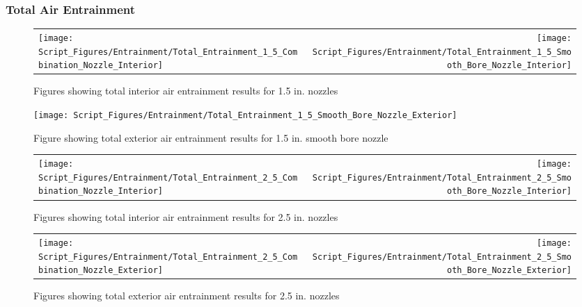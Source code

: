 \documentclass{article}
\begin{document}
\begin{appendices}
\clearpage

\subsubsection{Total Air Entrainment}

\begin{figure}[!ht]
\begin{tabular*}{\textwidth}{lr}
\texttt{[image: Script\_Figures/Entrainment/Total\_Entrainment\_1\_5\_Combination\_Nozzle\_Interior]} &
\texttt{[image: Script\_Figures/Entrainment/Total\_Entrainment\_1\_5\_Smooth\_Bore\_Nozzle\_Interior]} \\
\end{tabular*}
\caption{Figures showing total interior air entrainment results for 1.5 in. nozzles}
\label{fig:1_5_Interior_Total_Entrainment}
\end{figure}

\begin{figure}[!ht]
\centering
\texttt{[image: Script\_Figures/Entrainment/Total\_Entrainment\_1\_5\_Smooth\_Bore\_Nozzle\_Exterior]}
\caption{Figure showing total exterior air entrainment results for 1.5 in. smooth bore nozzle}
\label{fig:1_5_Exterior_Total_Entrainment}
\end{figure}

\clearpage

\begin{figure}[!ht]
\begin{tabular*}{\textwidth}{lr}
\texttt{[image: Script\_Figures/Entrainment/Total\_Entrainment\_2\_5\_Combination\_Nozzle\_Interior]} &
\texttt{[image: Script\_Figures/Entrainment/Total\_Entrainment\_2\_5\_Smooth\_Bore\_Nozzle\_Interior]} \\
\end{tabular*}
\caption{Figures showing total interior air entrainment results for 2.5 in. nozzles}
\label{fig:2_5_Interior_Total_Entrainment}
\end{figure}

\begin{figure}[!ht]
\begin{tabular*}{\textwidth}{lr}
\texttt{[image: Script\_Figures/Entrainment/Total\_Entrainment\_2\_5\_Combination\_Nozzle\_Exterior]} &
\texttt{[image: Script\_Figures/Entrainment/Total\_Entrainment\_2\_5\_Smooth\_Bore\_Nozzle\_Exterior]} \\
\end{tabular*}
\caption{Figures showing total exterior air entrainment results for 2.5 in. nozzles}
\label{fig:2_5_Exterior_Total_Entrainment}
\end{figure}


\end{appendices}
\end{document}

